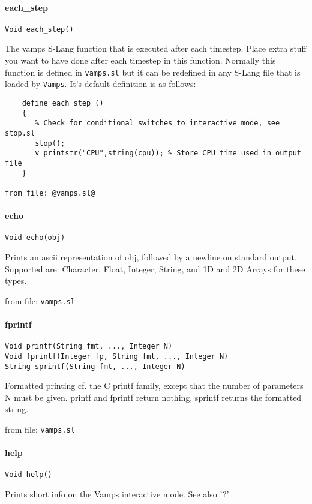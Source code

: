 \paragraph{each\_step}
\begin{verbatim}
Void each_step()
\end{verbatim}
The vamps S-Lang function that is executed after each timestep. 
Place extra stuff you want to have done after each timestep in 
this function. Normally this function is defined in {\tt vamps.sl} but
it can be redefined in any S-Lang file that is loaded by {\tt Vamps}.
It's default definition is as follows:
\begin{verbatim}
    define each_step ()
    {
       % Check for conditional switches to interactive mode, see stop.sl
       stop();
       v_printstr("CPU",string(cpu)); % Store CPU time used in output file
    }

from file: @vamps.sl@
\end{verbatim}


\paragraph{echo}
\begin{verbatim}
Void echo(obj)
\end{verbatim}
Prints an ascii representation of obj, followed by a newline
on standard output. Supported are: Character, Float, Integer,
String, and 1D and 2D Arrays for these types.

from file: {\tt vamps.sl}


\paragraph{fprintf}
\begin{verbatim}
Void printf(String fmt, ..., Integer N)
Void fprintf(Integer fp, String fmt, ..., Integer N)
String sprintf(String fmt, ..., Integer N)
\end{verbatim}
Formatted printing cf. the C printf family, except that
the number of parameters N must be given. printf and
fprintf return nothing, sprintf returns the formatted
string.

from file: {\tt vamps.sl}


\paragraph{help}
\begin{verbatim}
Void help()
\end{verbatim}
Prints short info on the Vamps interactive mode. See also '?'

